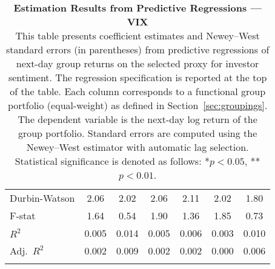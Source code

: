 \begin{table}[ht]
\begin{tabular}{l *{6}{c}}
Durbin-Watson & 2.06 & 2.02 & 2.06 & 2.11 & 2.02 & 1.80 \\
F-stat & 1.64 & 0.54 & 1.90 & 1.36 & 1.85 & 0.73 \\
\(R^2\) & 0.005 & 0.014 & 0.005 & 0.006 & 0.003 & 0.010 \\
Adj.\ \(R^2\) & 0.002 & 0.009 & 0.002 & 0.002 & 0.000 & 0.006 \\
\addlinespace
\midrule
\multicolumn{7}{c}{Specification tested: $R_{g,t+1} = \alpha_g + \beta_{sent,g} S_t + \phi R_{g,t} + \theta B_{g,t} + \gamma M_t + \varepsilon_{g,t+1}$}\\
\bottomrule
\end{tabular}
\caption{\textbf{Estimation Results from Predictive Regressions — VIX} \\
This table presents coefficient estimates and Newey--West standard errors (in parentheses) from predictive regressions of next-day group returns on the selected proxy for investor sentiment.
The regression specification is reported at the top of the table. Each column corresponds to a functional group portfolio (equal-weight) as defined in Section~\ref{sec:groupings}.
The dependent variable is the next-day log return of the group portfolio. Standard errors are computed using the Newey--West estimator with automatic lag selection. Statistical significance is denoted as follows: *$p<0.05$, **$p<0.01$.}
\label{tab:h2_vix_results}
\end{table}